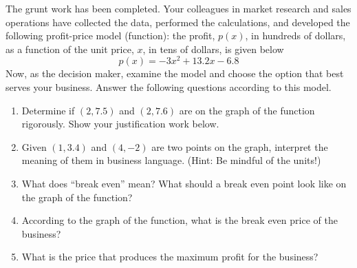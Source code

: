 \documentclass[twoside, 10pt]{article}
\begin{document}
The grunt work has been completed. Your colleagues in market research and sales operations have collected the data, performed the calculations, and developed the following profit-price model (function): the profit, $p(x)$, in hundreds of dollars, as a function of the unit price, $x$, in tens of dollars, is given below
\[
p(x) = -3x^2 + 13.2x-6.8
\]
Now, as the decision maker, examine the model and choose the option that best serves your business.
Answer the following questions according to this model.
\begin{enumerate}[leftmargin=*]
\item Determine if \((2, 7.5)\) and \((2, 7.6)\) are on the graph of the function rigorously. Show your justification work below. 
\item Given  \((1, 3.4)\) and \((4, -2)\) are two points on the graph, interpret the meaning of them in business language. (Hint: Be mindful of the units!)
\clearpage
\item What does ``break even'' mean? What should a break even point look like on the graph of the function?

\begin{center}
\end{center}
\item According to the graph of the function, what is the break even price of the business?

\item What is the price that produces the maximum profit for the business?
\end{enumerate}
\end{document}
